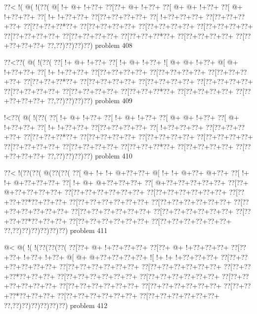 \vbox{\vbox{\goo
\0??<\- !(\- @(\- !(\0??(
\- @[\- !+\- @+\- !+\0??+
\0??[\0??+\- @+\- !+\0??+
\0??[\- @+\- @+\- !+\0??+
\0??[\- @+\- !+\0??+\0??+
\0??[\- !+\- !+\0??+\0??+
\0??[\0??+\0??+\0??+\0??+
\0??[\- !+\0??+\0??+\0??+
\0??[\0??+\0??+\0??+\0??+
\0??[\0??+\0??+\0??*\0??+
\0??[\0??+\0??+\0??+\0??+
\0??[\0??+\0??+\0??+\0??+
\0??[\0??+\0??+\0??+\0??+
\0??[\0??+\0??+\0??+\0??+
\0??[\0??+\0??+\0??+\0??+
\0??[\0??+\0??+\0??*\0??+
\0??[\0??+\0??+\0??+\0??+
\0??[\0??+\0??+\0??+\0??+
\0??,\0??)\0??)\0??)\0??)
}
\hfil problem 408\hfil\break
}

\vbox{\vbox{\goo
\0??<\0??(\- @(\- !(\0??(
\0??[\- !+\- @+\- !+\0??+
\0??[\- !+\- @+\- !+\0??+
\- ![\- @+\- @+\- !+\0??+
\- @[\- @+\- !+\0??+\0??+
\0??[\- !+\- !+\0??+\0??+
\0??[\0??+\0??+\0??+\0??+
\0??[\0??+\0??+\0??+\0??+
\0??[\0??+\0??+\0??+\0??+
\0??[\0??+\0??+\0??*\0??+
\0??[\0??+\0??+\0??+\0??+
\0??[\0??+\0??+\0??+\0??+
\0??[\0??+\0??+\0??+\0??+
\0??[\0??+\0??+\0??+\0??+
\0??[\0??+\0??+\0??+\0??+
\0??[\0??+\0??+\0??*\0??+
\0??[\0??+\0??+\0??+\0??+
\0??[\0??+\0??+\0??+\0??+
\0??,\0??)\0??)\0??)\0??)
}
\hfil problem 409\hfil\break
}

\vbox{\vbox{\goo
\- !<\0??(\- @(\- !(\0??(
\0??[\- !+\- @+\- !+\0??+
\0??[\- !+\- @+\- !+\0??+
\0??[\- @+\- @+\- !+\0??+
\0??[\- @+\- !+\0??+\0??+
\0??[\- !+\- !+\0??+\0??+
\0??[\0??+\0??+\0??+\0??+
\0??[\- !+\0??+\0??+\0??+
\0??[\0??+\0??+\0??+\0??+
\0??[\0??+\0??+\0??*\0??+
\0??[\0??+\0??+\0??+\0??+
\0??[\0??+\0??+\0??+\0??+
\0??[\0??+\0??+\0??+\0??+
\0??[\0??+\0??+\0??+\0??+
\0??[\0??+\0??+\0??+\0??+
\0??[\0??+\0??+\0??*\0??+
\0??[\0??+\0??+\0??+\0??+
\0??[\0??+\0??+\0??+\0??+
\0??,\0??)\0??)\0??)\0??)
}
\hfil problem 410\hfil\break
}

\vbox{\vbox{\goo
\0??<\- !(\0??(\0??(\- @(\0??(\0??(
\0??[\- @+\- !+\- !+\- @+\0??+\0??+
\- @[\- !+\- !+\- @+\0??+\- @+\0??+
\0??[\- !+\- !+\- @+\0??+\0??+\0??+
\0??[\- !+\- @+\- @+\0??+\0??+\0??+
\0??[\- @+\0??+\0??+\0??+\0??+\0??+
\0??[\0??+\- @+\0??+\0??+\0??+\0??+
\0??[\0??+\0??+\0??+\0??+\0??+\0??+
\0??[\0??+\0??+\0??+\0??+\0??+\0??+
\0??[\0??+\0??+\0??*\0??+\0??+\0??+
\0??[\0??+\0??+\0??+\0??+\0??+\0??+
\0??[\0??+\0??+\0??+\0??+\0??+\0??+
\0??[\0??+\0??+\0??+\0??+\0??+\0??+
\0??[\0??+\0??+\0??+\0??+\0??+\0??+
\0??[\0??+\0??+\0??+\0??+\0??+\0??+
\0??[\0??+\0??+\0??*\0??+\0??+\0??+
\0??[\0??+\0??+\0??+\0??+\0??+\0??+
\0??[\0??+\0??+\0??+\0??+\0??+\0??+
\0??,\0??)\0??)\0??)\0??)\0??)\0??)
}
\hfil problem 411\hfil\break
}

\vbox{\vbox{\goo
\- @<\- @(\- !(\- !(\0??(\0??(\0??(
\0??[\0??+\- @+\- !+\0??+\0??+\0??+
\0??[\0??+\- @+\- !+\0??+\0??+\0??+
\0??[\0??+\0??+\- !+\0??+\- !+\0??+
\- @[\- @+\- @+\0??+\0??+\0??+\0??+
\- ![\- !+\- !+\- !+\0??+\0??+\0??+
\0??[\0??+\0??+\0??+\0??+\0??+\0??+
\0??[\0??+\0??+\0??+\0??+\0??+\0??+
\0??[\0??+\0??+\0??+\0??+\0??+\0??+
\0??[\0??+\0??+\0??*\0??+\0??+\0??+
\0??[\0??+\0??+\0??+\0??+\0??+\0??+
\0??[\0??+\0??+\0??+\0??+\0??+\0??+
\0??[\0??+\0??+\0??+\0??+\0??+\0??+
\0??[\0??+\0??+\0??+\0??+\0??+\0??+
\0??[\0??+\0??+\0??+\0??+\0??+\0??+
\0??[\0??+\0??+\0??*\0??+\0??+\0??+
\0??[\0??+\0??+\0??+\0??+\0??+\0??+
\0??[\0??+\0??+\0??+\0??+\0??+\0??+
\0??,\0??)\0??)\0??)\0??)\0??)\0??)
}
\hfil problem 412\hfil\break
}

